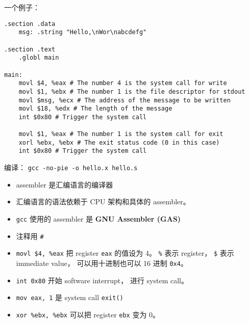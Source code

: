 
\begin{issues}
\issueDraft
\end{issues}

一个例子：
\begin{lstlisting}[language=none]
.section .data
    msg: .string "Hello,\nWor\nabcdefg"

.section .text
    .globl main

main:
    movl $4, %eax # The number 4 is the system call for write
    movl $1, %ebx # The number 1 is the file descriptor for stdout
    movl $msg, %ecx # The address of the message to be written
    movl $18, %edx # The length of the message
    int $0x80 # Trigger the system call

    movl $1, %eax # The number 1 is the system call for exit
    xorl %ebx, %ebx # The exit status code (0 in this case)
    int $0x80 # Trigger the system call
\end{lstlisting}

编译： \verb|gcc -no-pie -o hello.x hello.s|

\begin{itemize}
\item assembler 是汇编语言的编译器
\item 汇编语言的语法依赖于 CPU 架构和具体的 assembler。
\item \verb|gcc| 使用的 assembler 是 \textbf{GNU Assembler (GAS)}
\item 注释用 \verb|#|
\item \verb|movl $4, %eax| 把 register \verb|eax| 的值设为 4。 \verb|%| 表示 register， \verb|$| 表示 immediate value， 可以用十进制也可以 16 进制 \verb|0x4|。
\item \verb|int 0x80| 开始 software interrupt， 进行 system call。
\item \verb|mov eax, 1| 是 system call \verb|exit()|
\item \verb|xor %ebx, %ebx| 可以把 register \verb|ebx| 变为 0。
\end{itemize}
